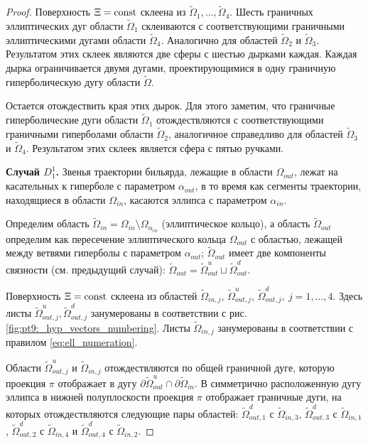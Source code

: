\begin{proof}
Поверхность $\Xi=\mathrm{const}$ склеена из $\widetilde{\Omega}_1, \ldots, \widetilde{\Omega}_4$.
Шесть граничных эллиптических дуг области $\widetilde{\Omega}_1$ склеиваются с соответствующими граничными эллиптическими дугами области $\widetilde{\Omega}_4$. Аналогично для областей $\widetilde{\Omega}_2$ и $\widetilde{\Omega}_3$.
Результатом этих склеек являются две сферы с шестью дырками каждая.
Каждая дырка ограничивается двумя дугами, проектирующимися в одну граничную гиперболическую дугу области $\widetilde{\Omega}$.

Остается отождествить края этих дырок. Для этого заметим, что граничные гиперболические дуги области $\widetilde{\Omega}_1$ отождествляются с соответствующими граничными гиперболами области $\widetilde{\Omega}_2$, аналогичное справедливо для областей $\widetilde{\Omega}_3$ и $\widetilde{\Omega}_4$. Результатом этих склеек является сфера с пятью ручками. 

\medskip
\textbf{Случай $D_1^1$.}
Звенья траектории бильярда, лежащие в области $\Omega_{out}$, лежат на касательных к гиперболе с параметром $\alpha_{out}$, в то время как сегменты траектории, находящиеся в области $\Omega_{in}$, касаются эллипса с параметром $\alpha_{in}$. 

Определим область $\widetilde{\Omega}_{in} = \Omega_{in} \setminus \Omega_{\alpha_{in}}$ (эллиптическое кольцо), а область $\widetilde{\Omega}_{out}$ определим как пересечение эллиптического кольца $\Omega_{out}$ с областью, лежащей между ветвями гиперболы с параметром $\alpha_{out}$; $\widetilde{\Omega}_{out}$ имеет две компоненты связности
(см.  предыдущий случай): $\widetilde{\Omega}_{out} = \widetilde{\Omega}_{out}^u \sqcup \widetilde{\Omega}_{out}^d$.

Поверхность $\Xi = \mathrm{const}$ склеена из областей 
$\widetilde{\Omega}_{in, j}$, $\widetilde{\Omega}_{out, j}^u$,  $\widetilde{\Omega}_{out, j}^d, \ j=1, \ldots, 4$. Здесь листы  $\widetilde{\Omega}_{out, j}^u, \widetilde{\Omega}_{out, j}^d$ занумерованы в соответствии с рис. \ref{fig:pt9:_hyp_vectors_numbering}. Листы $\widetilde{\Omega}_{in, j}$ занумерованы в соответствии с правилом  \eqref{eq:ell_numeration}.

Области $\widetilde{\Omega}_{out, j}^u$ и $\widetilde{\Omega}_{in, j}$ отождествляются по общей граничной дуге, которую проекция $\pi$ отображает в дугу 
$\partial \widetilde{\Omega}_{out}^u \cap \partial \widetilde{\Omega}_{in}$.
В симметрично расположенную дугу эллипса в нижней полуплоскости проекция $\pi$ отображает граничные дуги, на которых отождествляются следующие пары областей: 
$\widetilde{\Omega}_{out, 1}^d$ с $\widetilde{\Omega}_{in, 3}$,
$\widetilde{\Omega}_{out, 3}^d$ с $\widetilde{\Omega}_{in, 1}$,
$\widetilde{\Omega}_{out, 2}^d$ с $\widetilde{\Omega}_{in, 4}$ и 
$\widetilde{\Omega}_{out, 4}^d$ с $\widetilde{\Omega}_{in, 2}$.


\end{proof}
